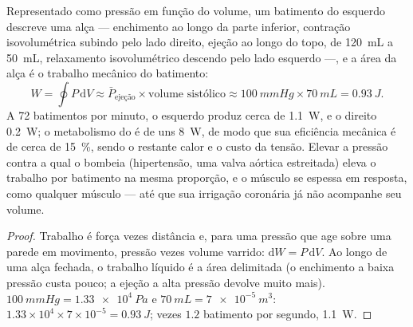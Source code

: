 \begin{theorem}\label{thm:b2:heart:work}
Representado como pressão em função do volume, um batimento do
 esquerdo descreve uma alça --- enchimento ao longo da parte
inferior, contração isovolumétrica subindo pelo lado direito, ejeção ao
longo do topo, de \qty{120}{mL} a \qty{50}{mL}, relaxamento
isovolumétrico descendo pelo lado esquerdo ---, e a área da alça é o
trabalho mecânico do batimento:
\[
W = \oint P\,\mathrm{d}V \approx \bar P_{\text{ejeção}}\times \text{volume sistólico} \approx \qty{100}{mmHg}\times\qty{70}{mL} = \qty{0.93}{J}.
\]
A 72 batimentos por minuto, o  esquerdo produz cerca de
\qty{1.1}{W}, e o direito \qty{0.2}{W}; o metabolismo do  é de
uns \qty{8}{W}, de modo que sua eficiência mecânica é de cerca de
\qty{15}{\%}, sendo o restante calor e o custo da tensão. Elevar a
pressão contra a qual o  bombeia (hipertensão, uma valva aórtica
estreitada) eleva o trabalho por batimento na mesma proporção, e o
músculo se espessa em resposta, como qualquer músculo --- até que sua
irrigação coronária já não acompanhe seu volume.
\end{theorem}
\begin{proof}
Trabalho é força vezes distância e, para uma pressão que age sobre uma
parede em movimento, pressão vezes volume varrido:
$\mathrm{d}W = P\,\mathrm{d}V$. Ao longo de uma alça fechada, o
trabalho líquido é a área delimitada (o enchimento a baixa pressão custa
pouco; a ejeção a alta pressão devolve muito mais).
$\qty{100}{mmHg} = \qty{1.33e4}{Pa}$ e $\qty{70}{mL} =
\qty{7e-5}{m^3}$: $1.33\times 10^{4}\times 7\times 10^{-5} =
\qty{0.93}{J}$; vezes $1.2$ batimento por segundo, \qty{1.1}{W}.
\end{proof}

